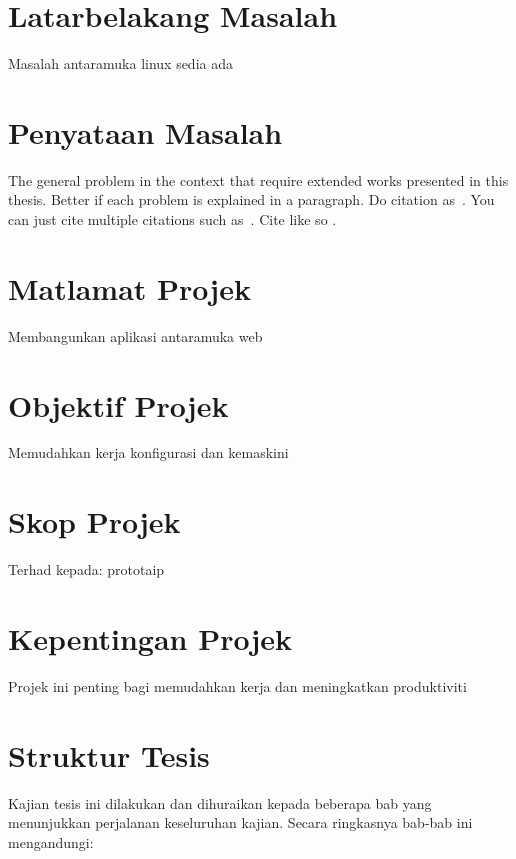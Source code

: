 \section{Latarbelakang Masalah}
Masalah antaramuka linux sedia ada

\section{Penyataan Masalah}
The general problem in the context that require extended works
presented in this thesis. Better if each problem is explained in a
paragraph. Do citation as~\cite{b1}. You can just cite multiple
citations such as~\cite{j1, c1, w1}. Cite like so \cite{b1}.

\section{Matlamat Projek}
Membangunkan aplikasi antaramuka web

\section{Objektif Projek}
Memudahkan kerja konfigurasi dan kemaskini

\section{Skop Projek}
Terhad kepada:
prototaip

\section{Kepentingan Projek}
Projek ini penting bagi memudahkan kerja dan meningkatkan produktiviti

\section{Struktur Tesis}
Kajian tesis ini dilakukan dan dihuraikan kepada beberapa bab yang menunjukkan perjalanan keseluruhan kajian. Secara ringkasnya bab-bab ini mengandungi:
\bgroup
\renewcommand\theenumi{\roman{enumi}}

